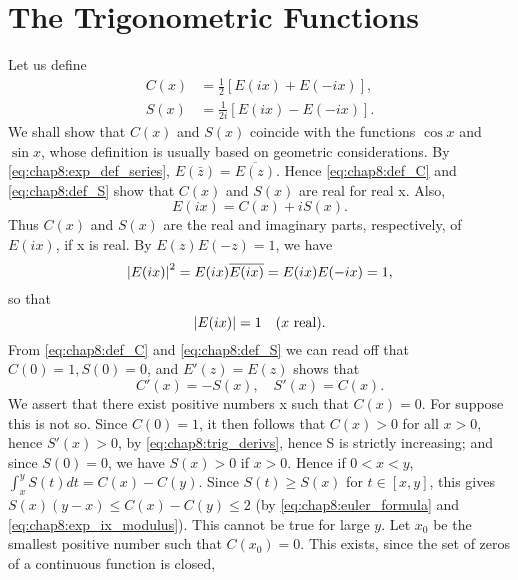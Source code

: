 

\section{The Trigonometric Functions}
\label{sec:chap8:trig_functions}

Let us define
\begin{align}
  C(x) &= \frac{1}{2}[E(ix) + E(-ix)], \label{eq:chap8:def_C} \\
  S(x) &= \frac{1}{2i}[E(ix) - E(-ix)]. \label{eq:chap8:def_S}
\end{align}
We shall show that $C(x)$ and $S(x)$ coincide with the functions
$\cos x$ and $\sin x$, whose definition is usually based on geometric
considerations.
By \eqref{eq:chap8:exp_def_series}, $E(\bar{z}) = \overline{E(z)}$.
Hence \eqref{eq:chap8:def_C} and \eqref{eq:chap8:def_S} show that
$C(x)$ and $S(x)$ are real for real x. Also,
\begin{equation} \label{eq:chap8:euler_formula}
  E(ix) = C(x) + iS(x).
\end{equation}
Thus $C(x)$ and $S(x)$ are the real and imaginary parts,
respectively, of $E(ix)$, if x is real. By $E(z)E(-z)=1$, we have
\[ \left\lvert E(ix) \right\rvert^2 = E(ix) \overline{E(ix)} = E(ix)E(-ix) = 1, \]
so that
\begin{equation} \label{eq:chap8:exp_ix_modulus}
  \left\lvert E(ix) \right\rvert = 1 \quad (x \text{ real}).
\end{equation}
From \eqref{eq:chap8:def_C} and \eqref{eq:chap8:def_S} we can read
off that $C(0)=1, S(0)=0$, and $E'(z)=E(z)$ shows that
\begin{equation} \label{eq:chap8:trig_derivs}
  C'(x) = -S(x), \quad S'(x) = C(x).
\end{equation}
We assert that there exist positive numbers x such that $C(x)=0$. For
suppose this is not so. Since $C(0)=1$, it then follows that $C(x)>0$
for all $x>0$, hence $S'(x)>0$, by \eqref{eq:chap8:trig_derivs},
hence S is strictly increasing; and since $S(0)=0$, we have $S(x)>0$
if $x>0$. Hence if $0<x<y$, $\int_x^y S(t) dt = C(x) - C(y)$. Since
$S(t) \ge S(x)$ for $t \in [x, y]$, this gives $S(x)(y-x) \le
C(x)-C(y) \le 2$ (by \eqref{eq:chap8:euler_formula} and
\eqref{eq:chap8:exp_ix_modulus}). This cannot be true for large $y$.
Let $x_0$ be the smallest positive number such that $C(x_0)=0$. This
exists, since the set of zeros of a continuous function is closed,
